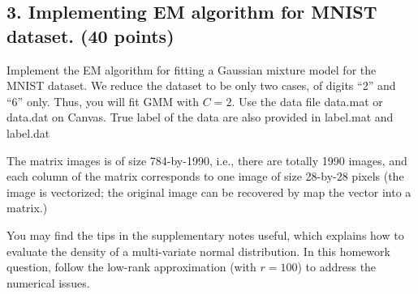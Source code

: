 \documentclass[twoside,12pt]{article}
\begin{document}
\clearpage

\subsection*{3. Implementing EM algorithm for MNIST dataset. (40 points)}

 Implement the EM algorithm for fitting a Gaussian mixture model for the MNIST dataset. We reduce the dataset to be only two cases, of digits ``2'' and ``6'' only. Thus, you will fit GMM with $C = 2$. Use the data file \textsf{data.mat} or \textsf{data.dat} on Canvas. True label of the data are also provided in \textsf{label.mat} and \textsf{label.dat}


The matrix \textsf{images} is of size 784-by-1990, i.e., there are totally 1990 images, and each column of the matrix corresponds to one image of size 28-by-28 pixels (the image is vectorized; the original image can be recovered by map the vector into a matrix.) 

You may find the tips in the supplementary notes useful, which explains how to evaluate the density of a multi-variate normal distribution. In this homework question, follow the low-rank approximation (with $r = 100$) to address the numerical issues.
\end{document}
